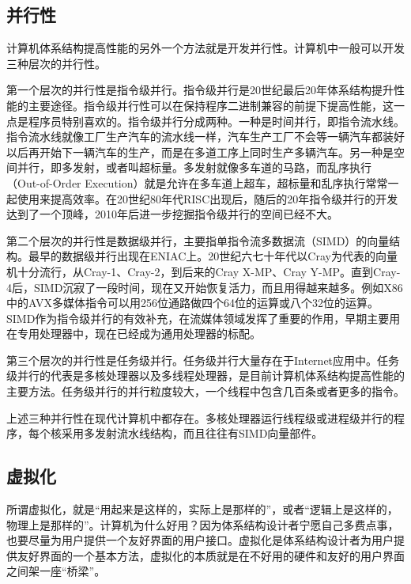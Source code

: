 \documentclass[]{ctexbook}
\begin{document}
\hypertarget{ux5e76ux884cux6027}{%
\subsection{并行性}\label{ux5e76ux884cux6027}}

计算机体系结构提高性能的另外一个方法就是开发并行性。计算机中一般可以开发三种层次的并行性。

第一个层次的并行性是指令级并行。指令级并行是20世纪最后20年体系结构提升性能的主要途径。指令级并行性可以在保持程序二进制兼容的前提下提高性能，这一点是程序员特别喜欢的。指令级并行分成两种。一种是时间并行，即指令流水线。指令流水线就像工厂生产汽车的流水线一样，汽车生产工厂不会等一辆汽车都装好以后再开始下一辆汽车的生产，而是在多道工序上同时生产多辆汽车。另一种是空间并行，即多发射，或者叫超标量。多发射就像多车道的马路，而乱序执行（Out-of-Order Execution）就是允许在多车道上超车，超标量和乱序执行常常一起使用来提高效率。在20世纪80年代RISC出现后，随后的20年指令级并行的开发达到了一个顶峰，2010年后进一步挖掘指令级并行的空间已经不大。

第二个层次的并行性是数据级并行，主要指单指令流多数据流（SIMD）的向量结构。最早的数据级并行出现在ENIAC上。20世纪六七十年代以Cray为代表的向量机十分流行，从Cray-1、Cray-2，到后来的Cray X-MP、Cray Y-MP。直到Cray-4后，SIMD沉寂了一段时间，现在又开始恢复活力，而且用得越来越多。例如X86中的AVX多媒体指令可以用256位通路做四个64位的运算或八个32位的运算。SIMD作为指令级并行的有效补充，在流媒体领域发挥了重要的作用，早期主要用在专用处理器中，现在已经成为通用处理器的标配。

第三个层次的并行性是任务级并行。任务级并行大量存在于Internet应用中。任务级并行的代表是多核处理器以及多线程处理器，是目前计算机体系结构提高性能的主要方法。任务级并行的并行粒度较大，一个线程中包含几百条或者更多的指令。

上述三种并行性在现代计算机中都存在。多核处理器运行线程级或进程级并行的程序，每个核采用多发射流水线结构，而且往往有SIMD向量部件。

\hypertarget{ux865aux62dfux5316}{%
\subsection{虚拟化}\label{ux865aux62dfux5316}}

所谓虚拟化，就是``用起来是这样的，实际上是那样的''，或者``逻辑上是这样的，物理上是那样的''。计算机为什么好用？因为体系结构设计者宁愿自己多费点事，也要尽量为用户提供一个友好界面的用户接口。虚拟化是体系结构设计者为用户提供友好界面的一个基本方法，虚拟化的本质就是在不好用的硬件和友好的用户界面之间架一座``桥梁''。
\end{document}
